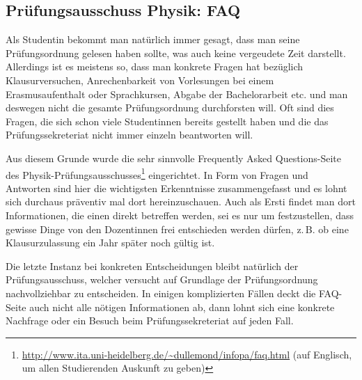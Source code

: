 \vspace{-2mm}
\subsection{Prüfungsausschuss Physik: FAQ}
\vspace{-1mm}
Als Studentin bekommt man natürlich immer gesagt, dass man seine Prüfungsordnung gelesen haben sollte, was auch keine vergeudete Zeit darstellt. Allerdings ist es meistens so, dass man konkrete Fragen hat bezüglich Klausurversuchen, Anrechenbarkeit von Vorlesungen bei einem Erasmusaufenthalt oder Sprachkursen, Abgabe der Bachelorarbeit etc. und man deswegen nicht die gesamte Prüfungsordnung durchforsten will. Oft sind dies Fragen, die sich schon viele Studentinnen bereits gestellt haben und die das Prüfungssekreteriat nicht immer einzeln beantworten will. 

Aus diesem Grunde wurde die sehr sinnvolle Frequently Asked Questions-Seite des Physik-Prüfungsausschusses\footnote{\url{http://www.ita.uni-heidelberg.de/~dullemond/infopa/faq.html} (auf Englisch, um allen Studierenden Auskunft zu geben)} eingerichtet. In Form von Fragen und Antworten sind hier die wichtigsten Erkenntnisse zusammengefasst und es lohnt sich durchaus präventiv mal dort hereinzuschauen. Auch als Ersti findet man dort Informationen, die einen direkt betreffen werden, sei es nur um festzustellen, dass gewisse Dinge von den Dozentinnen frei entschieden werden dürfen, z.\,B. ob eine Klausurzulassung ein Jahr später noch gültig ist.

Die letzte Instanz bei konkreten Entscheidungen bleibt natürlich der Prüfungsausschuss, welcher versucht auf Grundlage der Prüfungsordnung nachvollziehbar zu entscheiden. In einigen komplizierten Fällen deckt die FAQ-Seite auch nicht alle nötigen Informationen ab, dann lohnt sich eine konkrete Nachfrage oder ein Besuch beim Prüfungssekreteriat auf jeden Fall.
